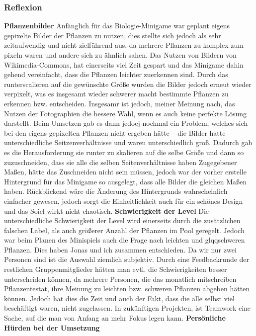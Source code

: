 \subsubsection{Reflexion}
\textbf{Pflanzenbilder}
Anfänglich für das Biologie-Minigame war geplant eigens gepixelte Bilder der Pflanzen zu nutzen, dies stellte sich jedoch als sehr zeitaufwendig und nicht zielführend aus, da mehrere Pflanzen zu komplex zum pixeln waren und andere sich zu ähnlich sahen.
Das Nutzen von Bildern von Wikimedia-Commons, hat einerseits viel Zeit gespart und das Minigame dahin gehend vereinfacht, dass die Pflanzen leichter zuerkennen sind. Durch das runterscalieren auf die gewünschte Größe wurden die Bilder jedoch erneut wieder verpixelt, was es insgesamt wieder schwerer macht bestimmte Pflanzen zu erkennen bzw. entscheiden.
Insgesamr ist jedoch, meiner Meinung nach, das Nutzen der Fotographien die bessere Wahl, wenn es auch keine perfekte Lösung darstellt.
Beim Umsetzen gab es dann jedocj nochmal ein Problem, welches sich bei den eigens gepixelten Pflanzen nicht ergeben hätte – die Bilder hatte unterschiedliche Seitzenverhältnisse und waren unterschiedlich groß. Dadurch gab es die Herausforderung sie runter zu skalieren auf die selbe Größe und dann so zuzuschneiden, dass sie alle die selben Seitenverhältnisse haben
Zugegebener Maßen, hätte das Zuschneiden nicht sein müssen, jedoch war der vorher erstelle Hintergrund für das Minigame so ausgelegt, dass alle Bilder die gleichen Maßen haben. Rückblickend wäre die Änderung des Hintergrunds wahrscheinlich einfacher gewesen, jedoch sorgt die Einheitlichkeit auch für ein schönes Design und das Soiel wirkt nicht chaotisch.
\textbf{Schwierigkeit der Level}
Die unterschiedliche Schwierigkeit der Level wird einerseits durch die zusätzlichen falschen Label, als auch größerer Anzahl der Pflanzen im Pool geregelt. Jedoch war beim Planen des Minispiels auch die Frage nach \glqq{}leichten\grqq{} und glqq{}schweren\grqq{} Pflanzen. Dies haben Jonas und ich zusammen entschieden. Da wir nur zwei Personen sind ist die Auswahl ziemlich subjektiv.
Durch eine Feedbackrunde der restlichen Gruppenmitglieder hätten man evtl. die Schwierigkeiten besser unterscheiden können, da mehrere Personen, die das monatlich mitschreiben Pflanzentestat, ihre Meinung zu leichten bzw. schweren Pflanzen abgeben hätten können.
Jedoch hat dies die Zeit und auch der Fakt, dass die alle selbst viel beschäftigt waren, nicht zugelassen. In zukünftigen Projekten, ist Teamwork eine Sache, auf die man von Anfang an mehr Fokus legen kann.
\textbf{Persönliche Hürden bei der Umsetzung}

